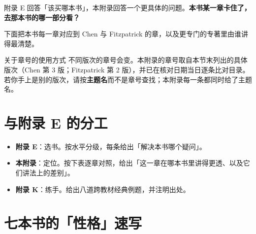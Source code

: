 
附录 E 回答「该买哪本书」，本附录回答一个更具体的问题。\textbf{本书某一章卡住了，去那本书的哪一部分看？}

下面把本书每一章对应到 Chen 与 Fitzpatrick 的章，以及更专门的专著里由谁讲得最清楚。

\begin{warning}{关于章号的使用方式}{}
不同版次的章号会变。本附录的章号取自本节末列出的具体版次（Chen 第 3 版；Fitzpatrick 第 2 版），并已在核对日期当日逐条比对目录。若你手上是别的版次，请按\textbf{主题名}而不是章号查找；本附录每一条都同时给了主题名。
\end{warning}


\section{与附录 E 的分工}

\begin{itemize}
\item \textbf{附录 E}：选书。按水平分级，每条给出「解决本书哪个疑问」。
\item \textbf{本附录}：定位。按下表逐章对照，给出「这一章在哪本书里讲得更透、以及它们讲法上的差别」。
\item \textbf{附录 K}：练手。给出八道跨教材经典例题，并注明出处。
\end{itemize}


\section{七本书的「性格」速写}

